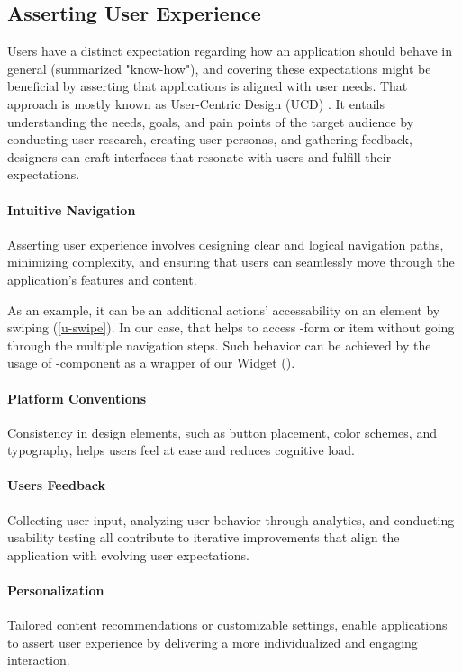 
\subsection{Asserting User Experience}

Users have a distinct expectation regarding how an application should behave in general (summarized "know-how"), and 
covering these expectations might be beneficial by asserting that applications is aligned with user needs. That approach
is mostly known as User-Centric Design (UCD) \cite{Stil16}. It entails understanding the needs, goals, and pain points 
of the target audience by conducting user research, creating user personas, and gathering feedback, designers can 
craft interfaces that resonate with users and fulfill their expectations.

\paragraph{Intuitive Navigation} Asserting user experience involves designing clear and logical navigation paths,
minimizing complexity, and ensuring that users can seamlessly move through the application's features and content.

As an example, it can be an additional actions' accessability on an element by swiping (\cref{u-swipe}). In our case, 
that helps to access -form or  item without going through the multiple navigation steps. Such behavior 
can be achieved by the usage of -component as a wrapper of our Widget ().



\paragraph{Platform Conventions} Consistency in design elements, such as button placement, color schemes, and 
typography, helps users feel at ease and reduces cognitive load.


\paragraph{Users Feedback} Collecting user input, analyzing user behavior through analytics, and conducting usability 
testing all contribute to iterative improvements that align the application with evolving user expectations.


\paragraph{Personalization} Tailored content recommendations or customizable settings, enable applications to assert 
user experience by delivering a more individualized and engaging interaction.
